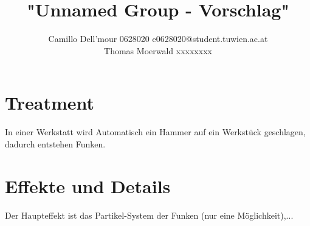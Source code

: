 \documentclass{scrartcl}
\title{"Unnamed Group - Vorschlag"}
\author{Camillo Dell'mour 0628020 e0628020@student.tuwien.ac.at\\ Thomas Moerwald xxxxxxxx}
\begin{document}
\maketitle
\section{Treatment}
In einer Werkstatt wird Automatisch ein Hammer auf ein Werkstück geschlagen, dadurch entstehen Funken.
\section{Effekte und Details}
Der Haupteffekt ist das Partikel-System der Funken \cite{van2000building}(nur eine Möglichkeit),...
% 
 
\end{document}
